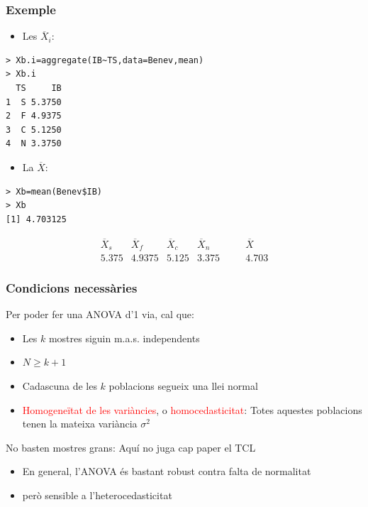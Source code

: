\documentclass[12pt,t]{beamer}
\newcommand{\red}[1]{\textcolor{red}{#1}}
\renewcommand{\emph}[1]{{\color{red}#1}}
\renewcommand{\geq}{\geqslant}
\theoremstyle{plain}
\theoremstyle{definition}
\begin{document}
\begin{frame}[fragile]
\frametitle{Exemple}\vspace*{-1ex}

\begin{itemize}
\item Les $\overline{X}_{i}$:
\end{itemize}
\begin{lstlisting}
> Xb.i=aggregate(IB~TS,data=Benev,mean)
> Xb.i
  TS     IB
1  S 5.3750
2  F 4.9375
3  C 5.1250
4  N 3.3750
\end{lstlisting}

\begin{itemize}
\item La $\overline{X}$:
\end{itemize}
\begin{lstlisting}
> Xb=mean(Benev$IB)
> Xb
[1] 4.703125
\end{lstlisting}


$$
\begin{array}{cccccc}
\overline{X}_s & \overline{X}_f & \overline{X}_c & \overline{X}_n & \quad & \overline{X}\\\hline
5.375 & 4.9375 &  5.125 & 3.375 & & 4.703
\end{array}
$$
\end{frame}



\begin{frame}
\frametitle{Condicions necessàries}

Per poder fer una ANOVA d'1 via, cal que:
\begin{itemize}
\item Les $k$ mostres siguin m.a.s. independents
\medskip

\item $N\geq k+1$\medskip

\item Cadascuna de les $k$ poblacions segueix una llei normal
\medskip

\item \red{Homogeneïtat de les variàncies}, o \red{homocedasticitat}: Totes aquestes poblacions tenen la mateixa variància $\sigma^2$
\end{itemize}\medskip


\emph{No basten mostres grans}: Aquí no juga cap paper el TCL 
\begin{itemize}
\item En general, l'ANOVA és bastant robust contra falta de normalitat

\item però sensible a l'heterocedasticitat
\end{itemize}

\end{frame}
\end{document}
